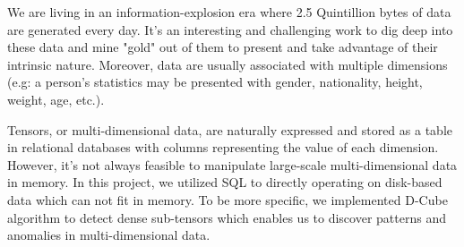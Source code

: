 We are living in an information-explosion era where 2.5 Quintillion bytes of data are generated every day. It's an interesting and challenging work to dig deep into these data and mine "gold" out of them to present and take advantage of their intrinsic nature. Moreover, data are usually associated with multiple dimensions (e.g: a person's statistics may be presented with gender, nationality, height, weight, age, etc.). 

Tensors, or multi-dimensional data, are naturally expressed and stored as a table in relational databases with columns representing the value of each dimension. However, it's not always feasible to manipulate large-scale multi-dimensional data in memory. In this project, we utilized SQL to directly operating on disk-based data which can not fit in memory. To be more specific, we implemented D-Cube\cite{shin2017d} algorithm to detect dense sub-tensors which enables us to discover patterns and anomalies in multi-dimensional data.